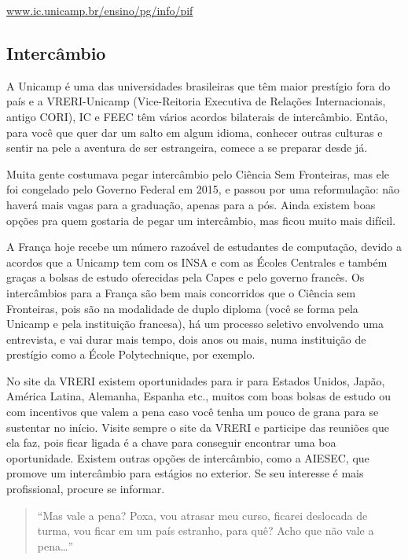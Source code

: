 \begin{center}
\url{www.ic.unicamp.br/ensino/pg/info/pif}
\end{center}


\subsection{Intercâmbio}

A Unicamp é uma das universidades brasileiras que têm maior prestígio fora do
país e a VRERI-Unicamp (Vice-Reitoria Executiva de Relações Internacionais,
antigo CORI), IC e FEEC têm vários acordos bilaterais de intercâmbio. Então,
para você que quer dar um salto em algum idioma, conhecer outras culturas e
sentir na pele a aventura de ser estrangeira, comece a se preparar desde já.

Muita gente costumava pegar intercâmbio pelo Ciência Sem Fronteiras, mas ele
foi congelado pelo Governo Federal em 2015, e passou por uma reformulação: não
haverá mais vagas para a graduação, apenas para a pós. Ainda existem boas
opções pra quem gostaria de pegar um intercâmbio, mas ficou muito mais difícil.

A França hoje recebe um número razoável de estudantes de computação, devido a
acordos que a Unicamp tem com os INSA e com as Écoles Centrales e também graças
a bolsas de estudo oferecidas pela Capes e pelo governo francês. Os
intercâmbios para a França são bem mais concorridos que o Ciência sem
Fronteiras, pois são na modalidade de duplo diploma (você se forma pela Unicamp
e pela instituição francesa), há um processo seletivo envolvendo uma
entrevista, e vai durar mais tempo, dois anos ou mais, numa instituição de
prestígio como a École Polytechnique, por exemplo.

No site da VRERI existem oportunidades para ir para Estados Unidos, Japão,
América Latina, Alemanha, Espanha etc., muitos com boas bolsas de estudo ou com
incentivos que valem a pena caso você tenha um pouco de grana para se sustentar
no início. Visite sempre o site da VRERI e participe das reuniões que ela faz,
pois ficar ligada é a chave para conseguir encontrar uma boa oportunidade.
Existem outras opções de intercâmbio, como a AIESEC, que promove um intercâmbio
para estágios no exterior. Se seu interesse é mais profissional, procure se
informar.

\begin{quote}
``Mas vale a pena? Poxa, vou atrasar meu curso, ficarei deslocada de turma, vou
ficar em um país estranho, para quê? Acho que não vale a pena{\dots}''
\end{quote}

